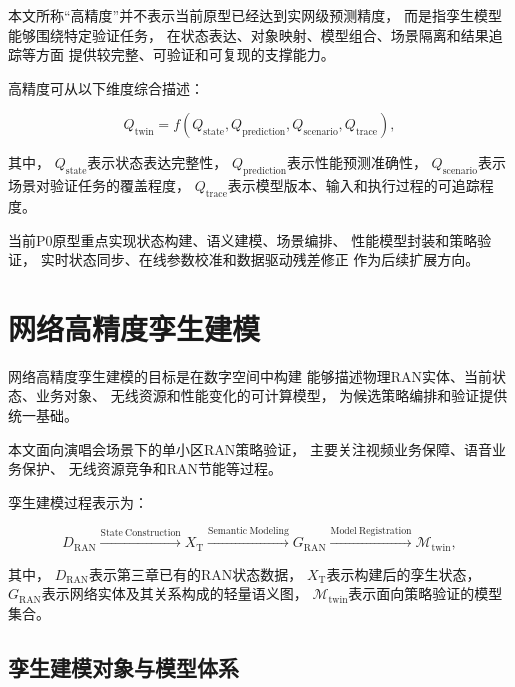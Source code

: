 \documentclass[lang=cn,12pt]{elegantbook}
\begin{document}
本文所称“高精度”并不表示当前原型已经达到实网级预测精度，
而是指孪生模型能够围绕特定验证任务，
在状态表达、对象映射、模型组合、场景隔离和结果追踪等方面
提供较完整、可验证和可复现的支撑能力。

高精度可从以下维度综合描述：

\begin{equation}
Q_{\mathrm{twin}}
=
f
\left(
Q_{\mathrm{state}},
Q_{\mathrm{prediction}},
Q_{\mathrm{scenario}},
Q_{\mathrm{trace}}
\right),
\label{eq:twin_quality_dimensions_overview}
\end{equation}

其中，
$Q_{\mathrm{state}}$表示状态表达完整性，
$Q_{\mathrm{prediction}}$表示性能预测准确性，
$Q_{\mathrm{scenario}}$表示场景对验证任务的覆盖程度，
$Q_{\mathrm{trace}}$表示模型版本、输入和执行过程的可追踪程度。

当前P0原型重点实现状态构建、语义建模、场景编排、
性能模型封装和策略验证，
实时状态同步、在线参数校准和数据驱动残差修正
作为后续扩展方向。


\section{网络高精度孪生建模}
\label{sec:high_fidelity_twin_modeling}

网络高精度孪生建模的目标是在数字空间中构建
能够描述物理RAN实体、当前状态、业务对象、
无线资源和性能变化的可计算模型，
为候选策略编排和验证提供统一基础。

本文面向演唱会场景下的单小区RAN策略验证，
主要关注视频业务保障、语音业务保护、
无线资源竞争和RAN节能等过程。

孪生建模过程表示为：

\begin{equation}
D_{\mathrm{RAN}}
\xrightarrow{\mathrm{State\ Construction}}
X_{\mathrm{T}}
\xrightarrow{\mathrm{Semantic\ Modeling}}
G_{\mathrm{RAN}}
\xrightarrow{\mathrm{Model\ Registration}}
\mathcal{M}_{\mathrm{twin}},
\label{eq:twin_modeling_process}
\end{equation}

其中，
$D_{\mathrm{RAN}}$表示第三章已有的RAN状态数据，
$X_{\mathrm{T}}$表示构建后的孪生状态，
$G_{\mathrm{RAN}}$表示网络实体及其关系构成的轻量语义图，
$\mathcal{M}_{\mathrm{twin}}$表示面向策略验证的模型集合。


\subsection*{孪生建模对象与模型体系}
\end{document}
